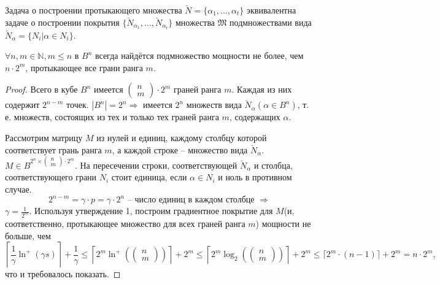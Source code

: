 \documentclass[11pt]{article}
\newcounter{th}\setcounter{th}{0}
\newcounter{stnmt}\setcounter{stnmt}{0}
\def\st{\par\smallskip\refstepcounter{stnmt}\textbf{\arabic{stnmt}}}
\newtheorem*{Statement}{Утверждение \st}
\begin{document}
Задача о построении протыкающего множества $\breve{N} = \{\alpha_1, \ldots, \alpha_t\}$
эквивалентна задаче о построении покрытия $\{\breve{N}_{\alpha_1}, \ldots, \breve{N}_{\alpha_t}\}$
множества $\mathfrak{M}$ подмножествами вида $\breve{N}_\alpha = \{N_i | \alpha \in N_i\}$.
\begin{Statement}
$\forall n, m \in \mathbb{N}, m \leq n$ в $B^n$ всегда найдётся подмножество мощности не более,
чем $n\cdot 2^m$, протыкающее все грани ранга $m$.
\end{Statement}
\begin{proof}
Всего в кубе $B^n$ имеется $\begin{pmatrix}n\\m\end{pmatrix}\cdot2^m$ граней ранга $m$. Каждая
из них содержит $2^{n - m}$ точек. $|B^n| = 2^n \Rightarrow$ имеется $2^n$ множеств вида
$\breve{N}_{\alpha}(\alpha \in B^n)$, т. е. множеств, состоящих из тех и только тех граней ранга
$m$, содержащих $\alpha$.

Рассмотрим матрицу $M$ из нулей и единиц, каждому столбцу которой соответствует грань ранга $m$,
а каждой строке -- множество вида $\breve{N}_{\alpha}$. $M \in B^{2^n\times\begin{pmatrix}n\\m\end{pmatrix}\cdot2^m}$.
На пересечении строки, соответствующей $\breve{N}_{\alpha}$ и столбца, соответствующего грани
$N_i$ стоит единица, если $\alpha \in N_i$ и ноль в противном случае.
\begin{equation*}
2^{n - m} = \gamma\cdot p = \gamma\cdot2^n \text{ -- число единиц в каждом столбце }
\Rightarrow
\end{equation*}
$\gamma = \frac1{2^m}$. Используя утверждение 1, построим градиентное покрытие для $M$(и,
соответственно, протыкающее множество для всех граней ранга $m$) мощности не больше, чем
\begin{equation*}
\left\lceil\frac1{\gamma}\ln^+(\gamma s)\right\rceil + \frac1{\gamma} \leq
\left\lceil2^m\ln^+\left(\begin{pmatrix}n\\m\end{pmatrix}\right)\right\rceil + 2^m \leq
\left\lceil2^m\log_2\left(\begin{pmatrix}n\\m\end{pmatrix}\right)\right\rceil + 2^m \leq
\lceil2^m\cdot(n - 1)\rceil + 2^m = n\cdot2^m,
\end{equation*}
что и требовалось показать.
\end{proof}
\end{document}

